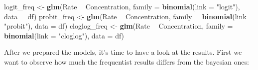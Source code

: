 \documentclass[]{article}
\newenvironment{Shaded}{\begin{snugshade}}{\end{snugshade}}
\newcommand{\DataTypeTok}[1]{\textcolor[rgb]{0.13,0.29,0.53}{#1}}
\newcommand{\KeywordTok}[1]{\textcolor[rgb]{0.13,0.29,0.53}{\textbf{#1}}}
\newcommand{\NormalTok}[1]{#1}
\newcommand{\OperatorTok}[1]{\textcolor[rgb]{0.81,0.36,0.00}{\textbf{#1}}}
\newcommand{\StringTok}[1]{\textcolor[rgb]{0.31,0.60,0.02}{#1}}
\begin{document}
\begin{Shaded}
\begin{Highlighting}[]
\NormalTok{logit_freq <-}\StringTok{ }\KeywordTok{glm}\NormalTok{(Rate }\OperatorTok{~}\StringTok{ }\NormalTok{Concentration, }\DataTypeTok{family =} \KeywordTok{binomial}\NormalTok{(}\DataTypeTok{link =} \StringTok{"logit"}\NormalTok{), }\DataTypeTok{data =}\NormalTok{ df)}
\NormalTok{probit_freq <-}\StringTok{ }\KeywordTok{glm}\NormalTok{(Rate }\OperatorTok{~}\StringTok{ }\NormalTok{Concentration, }\DataTypeTok{family =} \KeywordTok{binomial}\NormalTok{(}\DataTypeTok{link =} \StringTok{"probit"}\NormalTok{), }\DataTypeTok{data =}\NormalTok{ df)}
\NormalTok{cloglog_freq <-}\StringTok{ }\KeywordTok{glm}\NormalTok{(Rate }\OperatorTok{~}\StringTok{ }\NormalTok{Concentration, }\DataTypeTok{family =} \KeywordTok{binomial}\NormalTok{(}\DataTypeTok{link =} \StringTok{"cloglog"}\NormalTok{), }\DataTypeTok{data =}\NormalTok{ df)}
\end{Highlighting}
\end{Shaded}

After we prepared the models, it's time to have a look at the results.
First we want to observe how much the frequentist results differs from
the bayesian ones:
\end{document}
